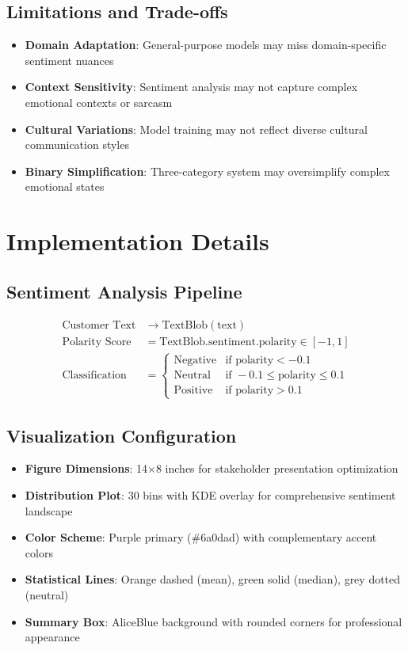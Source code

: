 \documentclass[11pt]{article}
\begin{document}
\subsection{Limitations and Trade-offs}
\begin{itemize}
\item \textbf{Domain Adaptation}: General-purpose models may miss domain-specific sentiment nuances
\item \textbf{Context Sensitivity}: Sentiment analysis may not capture complex emotional contexts or sarcasm
\item \textbf{Cultural Variations}: Model training may not reflect diverse cultural communication styles
\item \textbf{Binary Simplification}: Three-category system may oversimplify complex emotional states
\end{itemize}

\section{Implementation Details}

\subsection{Sentiment Analysis Pipeline}
\begin{align}
\text{Customer Text} &\rightarrow \text{TextBlob}(\text{text}) \\
\text{Polarity Score} &= \text{TextBlob.sentiment.polarity} \in [-1, 1] \\
\text{Classification} &= \begin{cases}
\text{Negative} & \text{if polarity} < -0.1 \\
\text{Neutral} & \text{if } -0.1 \leq \text{polarity} \leq 0.1 \\
\text{Positive} & \text{if polarity} > 0.1
\end{cases}
\end{align}

\subsection{Visualization Configuration}
\begin{itemize}
\item \textbf{Figure Dimensions}: 14×8 inches for stakeholder presentation optimization
\item \textbf{Distribution Plot}: 30 bins with KDE overlay for comprehensive sentiment landscape
\item \textbf{Color Scheme}: Purple primary (\#6a0dad) with complementary accent colors
\item \textbf{Statistical Lines}: Orange dashed (mean), green solid (median), grey dotted (neutral)
\item \textbf{Summary Box}: AliceBlue background with rounded corners for professional appearance
\end{itemize}
\end{document}
